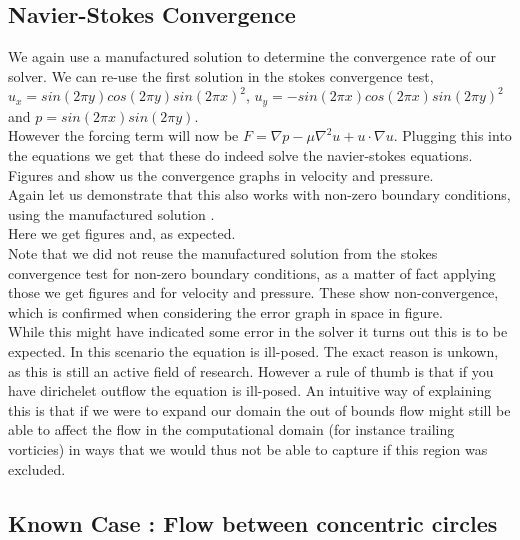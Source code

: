 \documentclass[11pt,twoside,a4paper]{article}
\begin{document}
\subsection{Navier-Stokes Convergence}

We again use a manufactured solution to determine the convergence rate of our solver.
We can re-use the first solution in the stokes convergence test, $u_x = sin(2 \pi y) cos(2 \pi y)sin(2 \pi x)^2$, $u_y= -sin(2 \pi x) cos(2 \pi x) sin(2 \pi y)^2$ and $p = sin(2 \pi x) sin(2 \pi y)$.\\
However the forcing term will now be $F = \nabla p - \mu \nabla^2 u + u \cdot \nabla u$.
Plugging this into the equations we get that these do indeed solve the navier-stokes equations.\\
Figures and show us the convergence graphs in velocity and pressure.\\


Again let us demonstrate that this also works with non-zero boundary conditions, using the manufactured solution .\\
Here we get figures and, as expected.\\


Note that we did not reuse the manufactured solution from the stokes convergence test for non-zero boundary conditions, as a matter of fact applying those we get figures and  for velocity and pressure. These show non-convergence, which is confirmed when considering the error graph in space in figure.\\
While this might have indicated some error in the solver it turns out this is to be expected. In this scenario the equation is ill-posed. The exact reason is unkown, as this is still an active field of research. However a rule of thumb is that if you have dirichelet outflow the equation is ill-posed. An intuitive way of explaining this is that if we were to expand our domain the out of bounds flow might still be able to affect the flow in the computational domain (for instance trailing vorticies) in ways that we would thus not be able to capture if this region was excluded. 

\subsection{Known Case : Flow between concentric circles}
\end{document}
